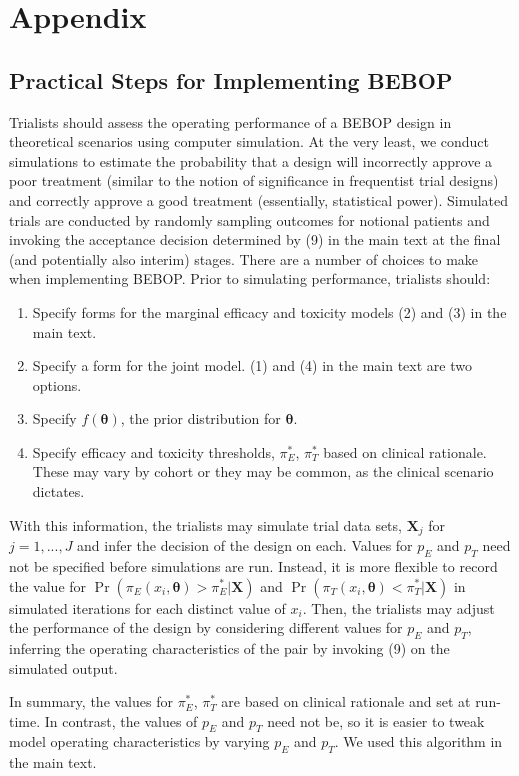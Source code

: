 \documentclass{article}
\begin{document}
\newpage
\section{Appendix}
\subsection{Practical Steps for Implementing BEBOP}
\label{s:tips}
Trialists should assess the operating performance of a BEBOP design in theoretical scenarios using computer simulation.
At the very least, we conduct simulations to estimate the probability that a design will incorrectly approve a poor treatment (similar to the notion of significance in frequentist trial designs) and correctly approve a good treatment (essentially, statistical power).
Simulated trials are conducted by randomly sampling outcomes for notional patients and invoking the acceptance decision determined by (9) in the main text at the final (and potentially also interim) stages.
There are a number of choices to make when implementing BEBOP.
Prior to simulating performance, trialists should:
\begin{enumerate}
	\item Specify forms for the marginal efficacy and toxicity models (2) and (3) in the main text.
	\item Specify a form for the joint model. (1) and (4) in the main text are two options.
	\item Specify $f(\boldsymbol{\theta})$, the prior distribution for $\boldsymbol{\theta}$.
	\item Specify efficacy and toxicity thresholds, $\pi_E^*$, $\pi_T^*$ based on clinical rationale. These may vary by cohort or they may be common, as the clinical scenario dictates.
\end{enumerate}
With this information, the trialists may simulate trial data sets, $\boldsymbol{X}_j$ for $j=1,...,J$ and infer the decision of the design on each.
Values for $p_E$ and $p_T$ need not be specified before simulations are run.
Instead, it is more flexible to record the value for $\Pr(\pi_E(x_i, \boldsymbol{\theta}) > \pi_E^*| \boldsymbol{X})$ and $\Pr(\pi_T(x_i, \boldsymbol{\theta}) < \pi_T^*| \boldsymbol{X})$ in simulated iterations for each distinct value of $x_i$.
Then, the trialists may adjust the performance of the design by considering different values for $p_E$ and $p_T$, inferring the operating characteristics of the pair by invoking (9) on the simulated output.

In summary, the values for $\pi_E^*$, $\pi_T^*$ are based on clinical rationale and set at run-time.
In contrast, the values of $p_E$ and $p_T$ need not be, so it is easier to tweak model operating characteristics by varying $p_E$ and $p_T$.
We used this algorithm in the main text.




\printbibliography
\end{document}

